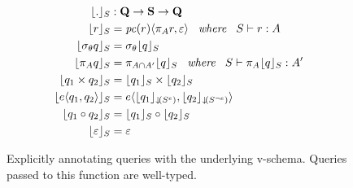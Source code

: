 \begin{figure}[H]
\begin{alignat*}{1}
\constrain . &: \qSet \to \vSchSet \to \qSet\\
%
\constrain \vRel &= 
\chc [\getPC {\vRel}] {\vPrj \vRel, \empRel}
\hspace{5pt} \textit{ where } \hspace{5pt}
\envWithoutVctx   {\vRel} {\vAttList}
\\
\constrain {\vSel \vQ}  &=  \vSel {\constrain \vQ}
\\
%
\constrain {\vPrj [\vAttList] \vQ} &= 
\vPrj [\vAttList \cap \VVal \vAttList] {\constrain \vQ}
\hspace{5pt} \textit{ where } \hspace{5pt}
\envWithoutVctx {\vPrj [\vAttList] {\constrain \vQ}} {\VVal \vAttList}
\\
%
\constrain {{\vQ_1} \times {\vQ_2}} &= 
\constrain {\vQ_1} \times \constrain {\vQ_2}
\\
%
%
\constrain {\chc {\vQ_1, \vQ_2}} &= 
\chc {\constrain [\pushIn {\annot [\dimMeta] \vSch}] {\vQ_1}, \constrain [\pushIn {\annot [\neg \dimMeta] \vSch}] {\vQ_2}}
\\
%
\constrain {{\vQ_1} \circ {\vQ_2}} &= 
\constrain {\vQ_1} \circ \constrain {\vQ_2}\\
%
\constrain {\empRel} &= \empRel
\end{alignat*}
\caption{
Explicitly annotating queries with the underlying v-schema. Queries passed to this 
function are well-typed.
}
\label{fig:constrain}
\end{figure}
